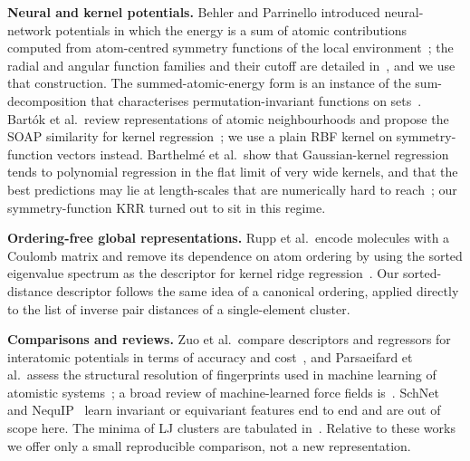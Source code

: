 \textbf{Neural and kernel potentials.} Behler and Parrinello introduced neural-network potentials in which the energy is a sum of atomic contributions computed from atom-centred symmetry functions of the local environment~\cite{behler2007generalized}; the radial and angular function families and their cutoff are detailed in~\cite{behler2011atom}, and we use that construction. The summed-atomic-energy form is an instance of the sum-decomposition that characterises permutation-invariant functions on sets~\cite{zaheer2017deep}. Bart\'ok et al.\ review representations of atomic neighbourhoods and propose the SOAP similarity for kernel regression~\cite{bartk2012representing}; we use a plain RBF kernel on symmetry-function vectors instead. Barthelm\'e et al.\ show that Gaussian-kernel regression tends to polynomial regression in the flat limit of very wide kernels, and that the best predictions may lie at length-scales that are numerically hard to reach~\cite{barthelm2022gaussian}; our symmetry-function KRR turned out to sit in this regime.

\textbf{Ordering-free global representations.} Rupp et al.\ encode molecules with a Coulomb matrix and remove its dependence on atom ordering by using the sorted eigenvalue spectrum as the descriptor for kernel ridge regression~\cite{rupp2011fast}. Our sorted-distance descriptor follows the same idea of a canonical ordering, applied directly to the list of inverse pair distances of a single-element cluster.

\textbf{Comparisons and reviews.} Zuo et al.\ compare descriptors and regressors for interatomic potentials in terms of accuracy and cost~\cite{zuo2019performance}, and Parsaeifard et al.\ assess the structural resolution of fingerprints used in machine learning of atomistic systems~\cite{parsaeifard2020assessment}; a broad review of machine-learned force fields is~\cite{unke2020machine}. SchNet~\cite{schtt2017schnet} and NequIP~\cite{batzner2021e} learn invariant or equivariant features end to end and are out of scope here. The minima of LJ clusters are tabulated in~\cite{wales1997global}. Relative to these works we offer only a small reproducible comparison, not a new representation.
